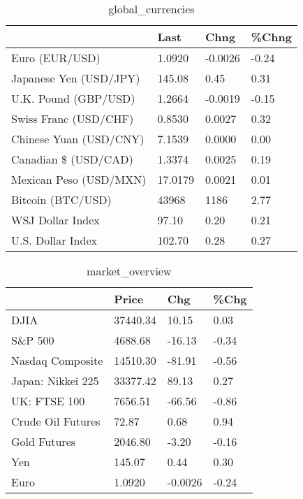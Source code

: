 \documentclass{article}%
\begin{document}
%


\begin{table}[htbp]%
\caption{global\_currencies}%
\centering%
\begin{adjustbox}{width=1\textwidth}%
\begin{tabular}{llll}
\toprule
                       &    Last &    Chng & \%Chng \\
\midrule
        Euro (EUR/USD) &  1.0920 & -0.0026 & -0.24 \\
Japanese Yen (USD/JPY) &  145.08 &    0.45 &  0.31 \\
  U.K. Pound (GBP/USD) &  1.2664 & -0.0019 & -0.15 \\
 Swiss Franc (USD/CHF) &  0.8530 &  0.0027 &  0.32 \\
Chinese Yuan (USD/CNY) &  7.1539 &  0.0000 &  0.00 \\
  Canadian \$ (USD/CAD) &  1.3374 &  0.0025 &  0.19 \\
Mexican Peso (USD/MXN) & 17.0179 &  0.0021 &  0.01 \\
     Bitcoin (BTC/USD) &   43968 &    1186 &  2.77 \\
      WSJ Dollar Index &   97.10 &    0.20 &  0.21 \\
     U.S. Dollar Index &  102.70 &    0.28 &  0.27 \\
\bottomrule
\end{tabular}
%
\end{adjustbox}%
\end{table}

%


\begin{table}[htbp]%
\caption{market\_overview}%
\centering%
\begin{adjustbox}{width=1\textwidth}%
\begin{tabular}{llll}
\toprule
                  &    Price &     Chg &  \%Chg \\
\midrule
             DJIA & 37440.34 &   10.15 &  0.03 \\
          S\&P 500 &  4688.68 &  -16.13 & -0.34 \\
 Nasdaq Composite & 14510.30 &  -81.91 & -0.56 \\
Japan: Nikkei 225 & 33377.42 &   89.13 &  0.27 \\
     UK: FTSE 100 &  7656.51 &  -66.56 & -0.86 \\
Crude Oil Futures &    72.87 &    0.68 &  0.94 \\
     Gold Futures &  2046.80 &   -3.20 & -0.16 \\
              Yen &   145.07 &    0.44 &  0.30 \\
             Euro &   1.0920 & -0.0026 & -0.24 \\
\bottomrule
\end{tabular}
%
\end{adjustbox}%
\end{table}

%
\end{document}
